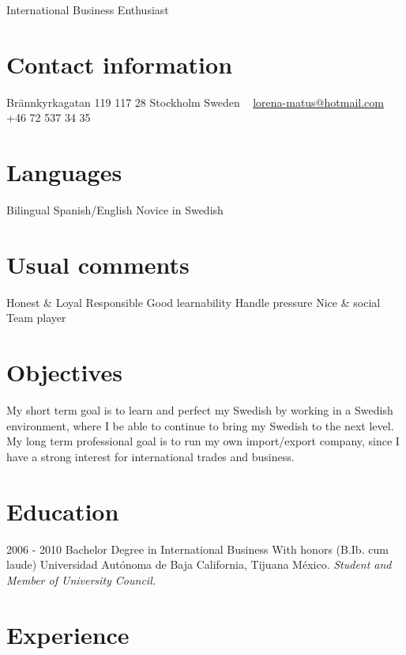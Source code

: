 \documentclass[]{friggeri-cv}
\begin{document}
       {International Business Enthusiast}

\begin{aside}
  \section{Contact information}
    Brännkyrkagatan 119
    117 28 Stockholm
    Sweden
    ~
    \href{mailto:lorena-matus@hotmail.com}{lorena-matus@hotmail.com}
    +46 72 537 34 35
  \section{Languages}
    Bilingual Spanish/English
    Novice in Swedish
  \section{Usual comments}
    Honest \& Loyal
    Responsible
    Good learnability
    Handle pressure
    Nice \& social
    Team player
\end{aside}

\section{Objectives}
    My short term goal is to learn and perfect my Swedish by working in a Swedish environment, where I be able to continue to bring my Swedish to the next level.
    My long term professional goal is to run my own import/export company, since I have a strong interest for international trades and business.

\section{Education}

\begin{entrylist}
  \entry
    {2006 - 2010}
    {Bachelor Degree in International Business}
    {With honors (B.Ib. cum laude)}
    {Universidad Autónoma de Baja California, Tijuana México.
    {\emph{Student and Member of University Council.}}}
\end{entrylist}

\section{Experience}
\end{document}
